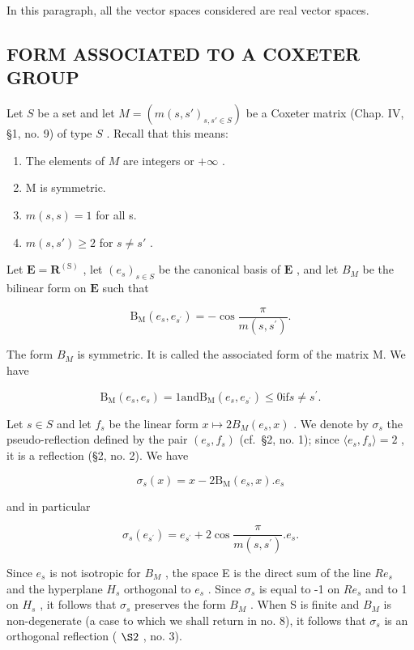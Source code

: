 In this paragraph, all the vector spaces considered are real vector spaces.

\subsection{FORM ASSOCIATED TO A COXETER GROUP}

Let \(S\) be a set and let \(M = (m(s, s')_{s, s' \in S})\) be a Coxeter matrix (Chap. IV, §1, no. 9) of type \(S\) . Recall that this means:

\begin{enumerate}
\def\labelenumi{(\arabic{enumi})}
\item
  The elements of \(M\) are integers or \(+\infty\) .
\item
  M is symmetric.
\item
  \(m(s, s) = 1\) for all s.
\item
  \(m(s, s') \geqslant 2\) for \(s \neq s'\) .
\end{enumerate}

Let \(\mathbf{E} = \mathbf{R}^{(\mathrm{S})}\) , let \((e_s)_{s \in S}\) be the canonical basis of \(\mathbf{E}\) , and let \(B_M\) be the bilinear form on \(\mathbf{E}\) such that

\[
\mathrm{B} _ {\mathrm{M}} (e _ {s}, e _ {s ^ {\prime}}) = - \cos \frac {\pi}{m (s , s ^ {\prime})}.
\]

The form \(B_{M}\) is symmetric. It is called the associated form of the matrix M. We have

\[
\mathrm{B} _ {\mathrm{M}} \left(e _ {s}, e _ {s}\right) = 1 \text {and} \mathrm{B} _ {\mathrm{M}} \left(e _ {s}, e _ {s ^ {\prime}}\right) \leqslant 0 \text {if} s \neq s ^ {\prime}.
\]

Let \(s \in S\) and let \(f_s\) be the linear form \(x \mapsto 2B_M(e_s, x)\) . We denote by \(\sigma_s\) the pseudo-reflection defined by the pair \((e_s, f_s)\) (cf.~§2, no. 1); since \(\langle e_s, f_s \rangle = 2\) , it is a reflection (§2, no. 2). We have

\[
\sigma_ {s} (x) = x - 2 \mathrm{B} _ {\mathrm{M}} (e _ {s}, x). e _ {s}
\]

and in particular

\[
\sigma_ {s} (e _ {s ^ {\prime}}) = e _ {s ^ {\prime}} + 2 \cos \frac {\pi}{m (s , s ^ {\prime})}. e _ {s}.
\]

Since \(e_{s}\) is not isotropic for \(B_{M}\) , the space E is the direct sum of the line \(Re_{s}\) and the hyperplane \(H_{s}\) orthogonal to \(e_{s}\) . Since \(\sigma_{s}\) is equal to -1 on \(Re_{s}\) and to 1 on \(H_{s}\) , it follows that \(\sigma_{s}\) preserves the form \(B_{M}\) . When S is finite and \(B_{M}\) is non-degenerate (a case to which we shall return in no. 8), it follows that \(\sigma_{s}\) is an orthogonal reflection ( \(\S2\) , no. 3).

